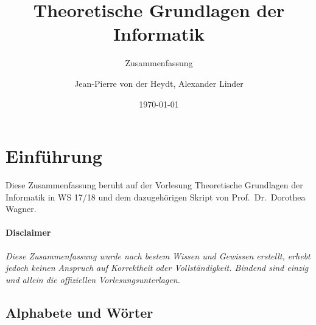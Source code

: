 \documentclass[11pt]{scrartcl}
\title{Theoretische Grundlagen der Informatik}
\subtitle{Zusammenfassung}
\author{Jean-Pierre von der Heydt, Alexander Linder}
\date{\today}
\theoremstyle{break}
\begin{document}
    \maketitle
    \pagebreak

    \tableofcontents
    \pagebreak



    \section{Einführung}
	\label{sec:einführung}

    Diese Zusammenfassung beruht auf der Vorlesung Theoretische Grundlagen der Informatik in WS 17/18 und dem dazugehörigen Skript von Prof.\ Dr.\ Dorothea Wagner.

    \paragraph{Disclaimer}
    \textit{
        Diese Zusammenfassung wurde nach bestem Wissen und Gewissen erstellt, erhebt jedoch keinen Anspruch auf Korrektheit
        oder Vollständigkeit.
        Bindend sind einzig und allein die offiziellen Vorlesungsunterlagen.
    }

    \subsection{Alphabete und Wörter}
	\label{subsec:alphabeteindexund-wörterindex}
\end{document}
